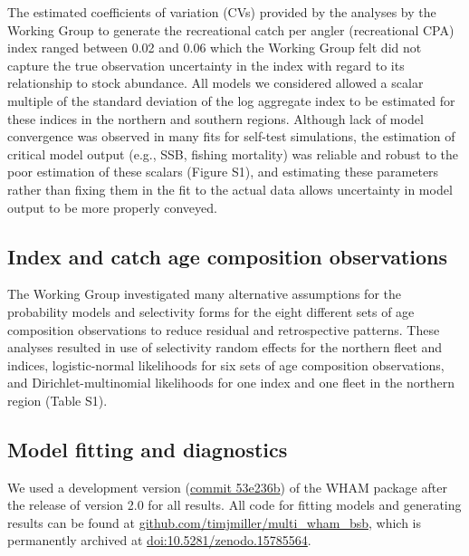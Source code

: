 \documentclass[
]{article}
\begin{document}
The estimated coefficients of variation (CVs) provided by the analyses by the Working Group to generate the recreational catch per angler (recreational CPA) index ranged between 0.02 and 0.06 which the Working Group felt did not capture the true observation uncertainty in the index with regard to its relationship to stock abundance. All models we considered allowed a scalar multiple of the standard deviation of the log aggregate index to be estimated for these indices in the northern and southern regions. Although lack of model convergence was observed in many fits for self-test simulations, the estimation of critical model output (e.g., SSB, fishing mortality) was reliable and robust to the poor estimation of these scalars (Figure S1), and estimating these parameters rather than fixing them in the fit to the actual data allows uncertainty in model output to be more properly conveyed.

\hypertarget{index-and-catch-age-composition-observations}{%
\subsection*{Index and catch age composition observations}\label{index-and-catch-age-composition-observations}}

The Working Group investigated many alternative assumptions for the probability models and selectivity forms for the eight different sets of age composition observations to reduce residual and retrospective patterns. These analyses resulted in use of selectivity random effects for the northern fleet and indices, logistic-normal likelihoods for six sets of age composition observations, and Dirichlet-multinomial likelihoods for one index and one fleet in the northern region (Table S1).

\hypertarget{model-fitting-and-diagnostics}{%
\subsection*{Model fitting and diagnostics}\label{model-fitting-and-diagnostics}}

We used a development version (\href{https://github.com/timjmiller/wham/tree/53e236b}{commit 53e236b}) of the WHAM package after the release of version 2.0 for all results. All code for fitting models and generating results can be found at \href{https://github.com/timjmiller/multi_wham_bsb}{github.com/timjmiller/multi\_wham\_bsb}, which is permanently archived at \href{https://doi.org/10.5281/zenodo.15785564}{doi:10.5281/zenodo.15785564}.
\end{document}
